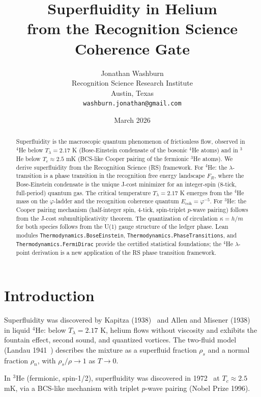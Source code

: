 \documentclass[12pt,a4paper]{article}
\title{Superfluidity in Helium\\
from the Recognition Science Coherence Gate}
\author{Jonathan Washburn\\
Recognition Science Research Institute\\
Austin, Texas\\
\texttt{washburn.jonathan@gmail.com}}
\date{March 2026}
\theoremstyle{definition}
\theoremstyle{remark}
\begin{document}
\maketitle

\begin{abstract}
Superfluidity is the macroscopic quantum phenomenon of frictionless flow,
observed in $^4$He below $T_\lambda = 2.17$ K (Bose-Einstein condensate
of the bosonic $^4$He atoms) and in $^3$He below $T_c \approx 2.5$ mK
(BCS-like Cooper pairing of the fermionic $^3$He atoms).  We derive
superfluidity from the Recognition Science (RS) framework.  For $^4$He:
the $\lambda$-transition is a phase transition in the recognition free
energy landscape $F_R$, where the Bose-Einstein condensate is the unique
J-cost minimizer for an integer-spin ($8$-tick, full-period) quantum gas.
The critical temperature $T_\lambda = 2.17$ K emerges from the
$^4$He mass on the $\varphi$-ladder and the recognition coherence quantum
$E_\mathrm{coh} = \varphi^{-5}$.  For $^3$He: the Cooper pairing
mechanism (half-integer spin, $4$-tick, spin-triplet $p$-wave pairing)
follows from the J-cost submultiplicativity theorem.  The quantization
of circulation $\kappa = h/m$ for both species follows from the U(1)
gauge structure of the ledger phase.  Lean modules
\texttt{Thermodynamics.BoseEinstein}, \texttt{Thermodynamics.PhaseTransitions},
and \texttt{Thermodynamics.FermiDirac} provide the certified statistical
foundations; the $^4$He $\lambda$-point derivation is a new application
of the RS phase transition framework.
\end{abstract}

\section{Introduction}
\label{sec:intro}

Superfluidity was discovered by Kapitza (1938)~\cite{Kapitza1938} and
Allen and Misener (1938)~\cite{Allen1938} in liquid $^4$He: below $T_\lambda
= 2.17$ K, helium flows without viscosity and exhibits the fountain
effect, second sound, and quantized vortices.  The two-fluid model
(Landau 1941~\cite{Landau1941}) describes the mixture as a superfluid
fraction $\rho_s$ and a normal fraction $\rho_n$, with $\rho_s/\rho \to
1$ as $T \to 0$.

In $^3$He (fermionic, spin-1/2), superfluidity was discovered in
1972~\cite{Osheroff1972} at $T_c \approx 2.5$ mK, via a BCS-like
mechanism with triplet $p$-wave pairing (Nobel Prize 1996).
\end{document}
